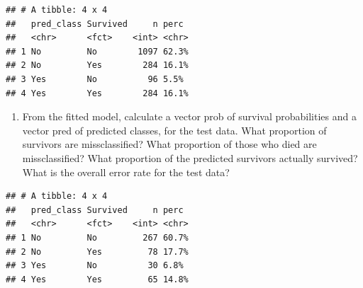 \documentclass[]{article}
\newenvironment{Shaded}{\begin{snugshade}}{\end{snugshade}}
\newcommand{\CommentTok}[1]{\textcolor[rgb]{0.56,0.35,0.01}{\textit{#1}}}
\newcommand{\DataTypeTok}[1]{\textcolor[rgb]{0.13,0.29,0.53}{#1}}
\newcommand{\FloatTok}[1]{\textcolor[rgb]{0.00,0.00,0.81}{#1}}
\newcommand{\KeywordTok}[1]{\textcolor[rgb]{0.13,0.29,0.53}{\textbf{#1}}}
\newcommand{\NormalTok}[1]{#1}
\newcommand{\OperatorTok}[1]{\textcolor[rgb]{0.81,0.36,0.00}{\textbf{#1}}}
\newcommand{\StringTok}[1]{\textcolor[rgb]{0.31,0.60,0.02}{#1}}
\providecommand{\tightlist}{%
  \setlength{\itemsep}{0pt}\setlength{\parskip}{0pt}}
\begin{document}
\begin{verbatim}
## # A tibble: 4 x 4
##   pred_class Survived     n perc 
##   <chr>      <fct>    <int> <chr>
## 1 No         No        1097 62.3%
## 2 No         Yes        284 16.1%
## 3 Yes        No          96 5.5% 
## 4 Yes        Yes        284 16.1%
\end{verbatim}

\begin{Shaded}
\end{Shaded}

\begin{enumerate}
\def\labelenumi{(\alph{enumi})}
\setcounter{enumi}{2}
\tightlist
\item
  From the fitted model, calculate a vector prob of survival
  probabilities and a vector pred of predicted classes, for the test
  data. What proportion of survivors are missclassified? What proportion
  of those who died are missclassified? What proportion of the predicted
  survivors actually survived? What is the overall error rate for the
  test data?
\end{enumerate}

\begin{Shaded}
\end{Shaded}

\begin{verbatim}
## # A tibble: 4 x 4
##   pred_class Survived     n perc 
##   <chr>      <fct>    <int> <chr>
## 1 No         No         267 60.7%
## 2 No         Yes         78 17.7%
## 3 Yes        No          30 6.8% 
## 4 Yes        Yes         65 14.8%
\end{verbatim}
\end{document}
